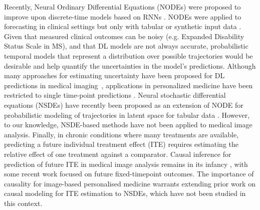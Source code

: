 \documentclass[runningheads]{llncs}
\begin{document}
Recently, Neural Ordinary Differential Equations (NODEs) \cite{Chen2018} were proposed to improve upon discrete-time models based on RNNs \cite{SerstinskyRNN}. NODEs were applied to forecasting in clinical settings but only with tabular or synthetic input data \cite{NeuralODEpharmakinetics,Tang2022,DeBrouwer2019,Norcliffe2023}. Given that measured clinical outcomes can be noisy (e.g. Expanded Disability Status Scale \cite{UncertaintyEDSS} in MS), and that DL models are not always accurate, probabilistic temporal models that represent a distribution over possible trajectories would be desirable and help quantify the uncertainties in the model's predictions. Although many approaches for estimating uncertainty have been proposed for DL predictions in medical imaging~\cite{UncertaintySurvey,BayesianMedicineSurvey}, applications in personalized medicine have been restricted to single time-point predictions \cite{dursofinley2023improving}. Neural stochastic differential equations (NSDEs)\cite{Xuechen2020} have recently been proposed as an extension of NODE for probabilistic modeling of trajectories in latent space for tabular data \cite{VDSintegratingNODE}. However, to our knowledge, NSDE-based methods have not been applied to medical image analysis. Finally, in chronic conditions where many treatments are available, predicting a future individual treatment effect (ITE) requires estimating the relative effect of one treatment against a comparator. Causal inference for prediction of future ITE in medical image analysis remains in its infancy \cite{SotosCMLhealthcare}, with some recent work focused on future fixed-timepoint outcomes\cite{dursofinley2022personalized,ma2023treatmentHemmorage}. The importance of causality for image-based personalised medicine warrants extending prior work on causal modeling for ITE estimation to NSDEs, which have not been studied in this context.
\end{document}
